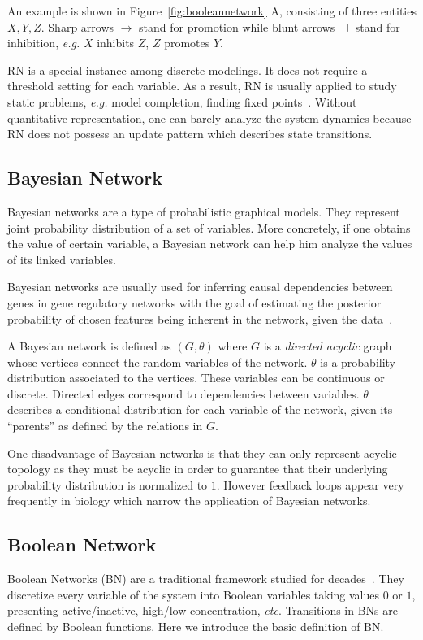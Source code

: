 An example is shown in Figure~\ref{fig:booleannetwork} A, consisting of three entities $X,Y,Z$.
Sharp arrows $\to$ stand for promotion while blunt arrows $\dashv$ stand for inhibition,
\textit{e.g.} $X$ inhibits $Z$, $Z$ promotes $Y$.

RN is a special instance among discrete modelings.
It does not require a threshold setting for each variable.
As a result, RN is usually applied to study static problems, \textit{e.g.} model completion, finding fixed points~\cite{yamamoto2014completing}.
Without quantitative representation, one can barely analyze the system dynamics because RN does not possess an update pattern which describes state transitions.

\subsection{Bayesian Network}
Bayesian networks are a type of probabilistic graphical models. 
They represent joint probability distribution of a set of variables.
More concretely, if one obtains the value of certain variable, a Bayesian network can help him analyze the values of its linked variables.

Bayesian networks are usually used for inferring causal dependencies between genes in gene regulatory networks with the goal of estimating the posterior probability of chosen features being inherent in the network, given the data~\cite{friedman2000using}.

A Bayesian network is defined as $(G, \theta)$ where $G$ is a \textit{directed acyclic} graph whose vertices connect the random variables of the network.
$\theta$ is a probability distribution associated to the vertices. 
These variables can be continuous or discrete. 
Directed edges correspond to dependencies between variables. 
$\theta$ describes a conditional distribution for each variable of the network, given its ``parents'' as defined by the relations in $G$.

One disadvantage of Bayesian networks is that they can only represent acyclic topology as they must be acyclic in order to guarantee that their underlying probability distribution is normalized to $1$.
However feedback loops appear very frequently in biology which narrow the application of Bayesian networks.

\subsection{Boolean Network}
Boolean Networks (BN) are a traditional framework studied for decades~\cite{kauffman1969}.
They discretize every variable of the system into Boolean variables taking values $0$ or $1$, presenting active/inactive, high/low concentration, \textit{etc}. 
Transitions in BNs are defined by Boolean functions.
Here we introduce the basic definition of BN.

